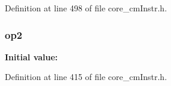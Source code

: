 Definition at line 498 of file core\-\_\-cm\-Instr.\-h.

\hypertarget{group___c_m_s_i_s___core___instruction_interface_gadb2bb33809b6f35ba4d176cbec7c7b75}{
\subsubsection[{op2}]{ op2}}\label{group___c_m_s_i_s___core___instruction_interface_gadb2bb33809b6f35ba4d176cbec7c7b75}
{\bfseries Initial value\-:}


Definition at line 415 of file core\-\_\-cm\-Instr.\-h.

